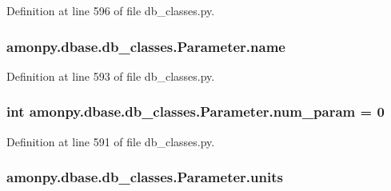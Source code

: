 Definition at line 596 of file db\-\_\-classes.\-py.

\hypertarget{classamonpy_1_1dbase_1_1db__classes_1_1_parameter_a0578aa061ddcf50100cdcbb3851b4c8d}{
\subsubsection[{name}]{\setlength{\rightskip}{0pt plus 5cm}amonpy.\-dbase.\-db\-\_\-classes.\-Parameter.\-name}}\label{classamonpy_1_1dbase_1_1db__classes_1_1_parameter_a0578aa061ddcf50100cdcbb3851b4c8d}


Definition at line 593 of file db\-\_\-classes.\-py.

\hypertarget{classamonpy_1_1dbase_1_1db__classes_1_1_parameter_a505d26cebffda6dbddfb2366052606e2}{
\subsubsection[{num\-\_\-param}]{\setlength{\rightskip}{0pt plus 5cm}int amonpy.\-dbase.\-db\-\_\-classes.\-Parameter.\-num\-\_\-param = 0\hspace{0.3cm}{\ttfamily [static]}}}\label{classamonpy_1_1dbase_1_1db__classes_1_1_parameter_a505d26cebffda6dbddfb2366052606e2}


Definition at line 591 of file db\-\_\-classes.\-py.

\hypertarget{classamonpy_1_1dbase_1_1db__classes_1_1_parameter_aafe3f971978610b9e6a29a9853c71c61}{
\subsubsection[{units}]{\setlength{\rightskip}{0pt plus 5cm}amonpy.\-dbase.\-db\-\_\-classes.\-Parameter.\-units}}\label{classamonpy_1_1dbase_1_1db__classes_1_1_parameter_aafe3f971978610b9e6a29a9853c71c61}


